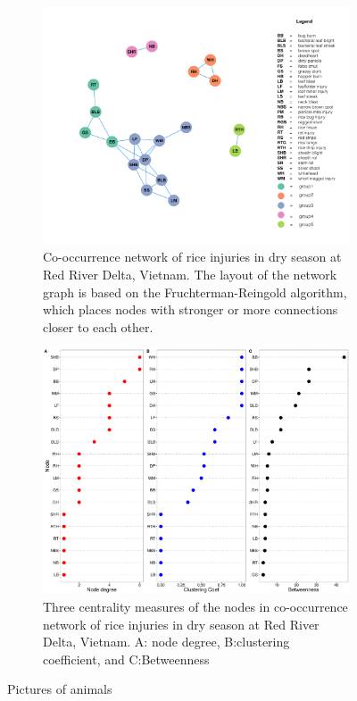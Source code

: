 \begin{figure}
    \centering
    \begin{subfigure}[b]{1\textwidth}
        \includegraphics[width = 1\textwidth]{figures/networkRR_ds.pdf}
        \caption{Co-occurrence network of rice injuries in dry season at Red River Delta, Vietnam. The layout of the network graph is based on the Fruchterman-Reingold algorithm, which places nodes with stronger or more connections closer to each other.}
        \label{fig:gull}
    \end{subfigure}
    \begin{subfigure}[b]{1\textwidth}
        \includegraphics[width = 1\textwidth]{figures/nodepropRR_ds.pdf}
        \caption{Three centrality measures of the nodes in co-occurrence network of rice injuries in dry season at Red River Delta, Vietnam. A: node degree, B:clustering coefficient, and C:Betweenness}
        \label{fig:nodepropCP_ds}
    \end{subfigure}
    \caption{Pictures of animals}
    \label{fig:animals}
\end{figure}

